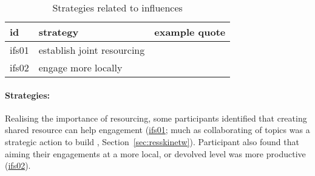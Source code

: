 \begin{table}[!ht]
\footnotesize
\caption{Strategies related to \skiinfr{} influences}\label{tab:resskiinfrstrat}
\begin{tabular}{L{.06\linewidth}L{.3\linewidth}L{.64\linewidth}} \hline
\textbf{id} & \textbf{strategy} & \textbf{example quote} \\ \hline \hline
ifs01 & establish joint resourcing &  \\[5mm]
ifs02 & engage more locally &  \\[5mm]
\hline
 \end{tabular}
\end{table}

\paragraph{Strategies:}
Realising the importance of resourcing, some participants identified that creating shared resource can help engagement (\hyperref[tab:resskiinfrstrat]{ifs01}; much as collaborating of topics was a strategic action to build \skinetw, Section~\ref{sec:resskinetw}). Participant also found that aiming their engagements at a more local, or devolved level was more productive (\hyperref[tab:resskiinfrstrat]{ifs02}).

\subsection{\titeven}\label{sec:resskieven}


